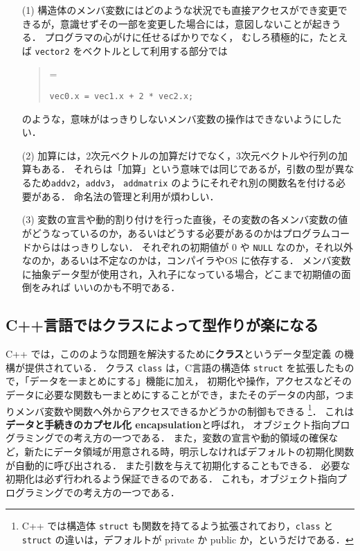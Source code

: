 \documentclass[11pt,a4,epsf]{jarticle}
\def\linesparpage#1{\baselineskip=\textheight\divide\baselineskip#1}
\begin{document}
\begin{enumerate}
 \item[(1)] 
構造体のメンバ変数にはどのような状況でも直接アクセスができ変更できるが，意識せずその一部を変更した場合には，意図しないことが起きうる．
プログラマの心がけに任せるばかりでなく，
むしろ積極的に，たとえば \verb+vector2+ をベクトルとして利用する部分では
\begin{quote}
\linesparpage{50}
\begin{verbatim}
vec0.x = vec1.x + 2 * vec2.x;
\end{verbatim}
\end{quote}
のような，意味がはっきりしないメンバ変数の操作はできないようにしたい．
 \item[(2)] 
加算には，2次元ベクトルの加算だけでなく，3次元ベクトルや行列の加算もある．
それらは「加算」という意味では同じであるが，引数の型が異なるため\verb+addv2+，\verb+addv3+，
\verb+addmatrix+ のようにそれぞれ別の関数名を付ける必要がある．
命名法の管理と利用が煩わしい．
\item[(3)] 
変数の宣言や動的割り付けを行った直後，その変数の各メンバ変数の値がどうなっているのか，あるいはどうする必要があるのかはプログラムコードからははっきりしない．
それぞれの初期値が 0 や \verb+NULL+ なのか，それ以外なのか，あるいは不定なのかは，コンパイラやOS に依存する．
メンバ変数に抽象データ型が使用され，入れ子になっている場合，どこまで初期値の面倒をみれば
いいのかも不明である．
\end{enumerate}


\subsection{C++言語ではクラスによって型作りが楽になる}

C++ では，こののような問題を解決するために{\bf クラス}というデータ型定義
の機構が提供されている．
クラス \verb+class+ は，C言語の構造体 \verb+struct+ を拡張したもので，「データを一まとめにする」機能に加え，
初期化や操作，アクセスなどそのデータに必要な関数も一まとめにすることができ，またそのデータの内部，つまりメンバ変数や関数へ外からアクセスできるかどうかの制御もできる
\footnote{ C++ では構造体 {\tt struct} も関数を持てるよう拡張されており，{\tt class} と {\tt struct} の違いは，デフォルトが private か public か，というだけである．}．
これは{\bf データと手続きのカプセル化 encapsulation}と呼ばれ，
オブジェクト指向プログラミングでの考え方の一つである．
また，変数の宣言や動的領域の確保など，新たにデータ領域が用意される時，明示しなければデフォルトの初期化関数が自動的に呼び出される．
また引数を与えて初期化することもできる．
必要な初期化は必ず行われるよう保証できるのである．
これも，オブジェクト指向プログラミングでの考え方の一つである．
\end{document}
